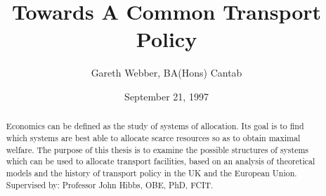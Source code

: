 \documentclass[12pt,a4paper]{memoir}
\begin{document}
\title{Towards A Common Transport Policy}
\author{Gareth Webber, BA(Hons) Cantab}
\date{September 21, 1997}

\maketitle
\begin{abstract}
Economics can be defined as the study of systems of allocation. Its goal is to find which systems are best able to allocate scarce resources so as to obtain maximal welfare. The purpose of this thesis is to examine the possible structures of systems which can be used to allocate transport facilities, based on an analysis of theoretical models and the history of transport policy in the UK and the European Union.
Supervised by: Professor John Hibbs, OBE, PhD, FCIT.
\end{abstract}


	
		






\end{document}
